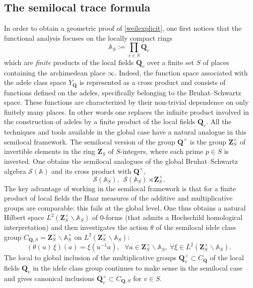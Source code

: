 \documentclass[11pt,a4paper]{article}
\newcommand{\Q}{\mathbf{Q}}
\newcommand{\Z}{\mathbf{Z}}
\newcommand{\A}{\mathbb{A}}
\def\cS{{\mathcal S}}
\theoremstyle{plain}
\theoremstyle{definition} %
\begin{document}
\subsection{The semilocal trace formula}\label{sectsemi}
In order to obtain a geometric proof of \eqref{weilexplicit}, one first notices that the functional analysis focuses on the locally compact rings  
\[
\A_S := \prod_{v \in S} \Q_v
\]
which are {\em finite} products of the local fields $\Q_v$ over a finite set $S$ of places containing the archimedean place $\infty$. Indeed, 
the function space associated with the adele class space $ Y_\mathbf{Q}$  is represented as a cross product and consists of functions defined on the adeles, specifically belonging to the Bruhat–Schwartz space. These functions are characterized by their non-trivial dependence on only finitely many places. In other words one  replaces the infinite product involved in the construction of adeles by a finite product of the local fields $\Q_v$. All the techniques and tools available in the global case  have a natural  analogue in this semilocal framework. The semilocal version of the group $\Q^\times$ is the group $\Z_S^\times$ of invertible elements in the ring $\Z_S$  of $S$-integers, where each prime $p\in S$ is inverted.  One obtains  the semilocal analogues of the global Bruhat–Schwartz algebra $\cS(\A)$ and  its cross product with $\Q^\times$,
\begin{equation}\label{semiloc1} 
\cS(\A_{S}), \  \  \cS(\A_{S})\rtimes \Z_S^\times.
\end{equation}
The key advantage of working in the semilocal framework is that for a finite product of local fields the Haar measures of the additive and multiplicative groups are comparable: this  fails at the global level. One thus obtains a natural Hilbert space $L^2( \Z_S^\times\backslash \A_{S})$  of $0$-forms (that admits a Hochschild homological interpretation) and 
then investigates the action $\theta$  of the semilocal idele class group $C_{\Q,S}=\Z_S^\times\backslash \A_{S}^\times$ on  $L^2( \Z_S^\times\backslash \A_{S})$:
    \begin{equation}\label{scalingS}
(\theta(u) \, \xi) (a) = \xi (u^{-1} a), \ \ \  \forall
a \in  \Z_S^\times\backslash \A_{S}, \ \forall \xi\in L^2( \Z_S^\times\backslash \A_{S}).
\end{equation}
The local to global inclusion of the multiplicative groups  $\Q_v^\times\subset C_\Q$ of the local fields $\Q_v$ in the idele class group continues to make sense in the semilocal case and gives canonical inclusions $\Q^\times_v\subset C_{\Q,S}$ for $v\in S$.
\end{document}
